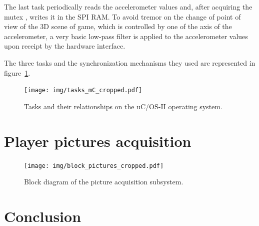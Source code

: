 \documentclass[english, DIV=13]{scrartcl}
\begin{document}
The last task periodically reads the accelerometer values and, after acquiring the mutex
, writes it in the SPI RAM. To avoid tremor on the change of point of
view of the 3D scene of game, which is controlled by one of the axis of the
accelerometer, a very basic low-pass filter is applied to the accelerometer values upon
receipt by the hardware interface.

The three tasks and the synchronization mechanisms they used are represented in
figure~\ref{fig:tasks-mc}.

\begin{figure}
    \centering
    \texttt{[image: img/tasks\_mC\_cropped.pdf]}
    \caption{Tasks and their relationships on the uC/OS-II operating system.}
    \label{fig:tasks-mc}
\end{figure}

\section{Player pictures acquisition}
\label{sec:pic-acq}

\begin{figure}
    \centering
    \texttt{[image: img/block\_pictures\_cropped.pdf]}
    \caption{Block diagram of the picture acquisition subsystem.}
\end{figure}

\section{Conclusion}
\end{document}
